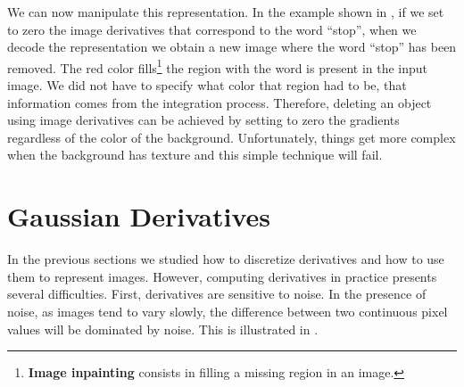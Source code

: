 We can now manipulate this representation. In the example shown in \fig{\ref{fig:edit_with_derivatives}}, if we set to zero the image derivatives that correspond to the word ``stop'', when we decode the representation we obtain a new image where the word ``stop'' has been removed. The red color fills\footnote{{\bf Image inpainting} consists in filling a missing region in an image.}  the region with the word is present in the input image.
We did not have to specify what color that region had to be, that information comes from the integration process. Therefore, deleting an object using image derivatives can be achieved by setting to zero the gradients regardless of the color of the background. Unfortunately, things get more complex when the background has texture and this simple technique will fail.




\section{Gaussian Derivatives}

In the previous sections we studied how to discretize derivatives and how to use them to represent images. However, computing derivatives in practice presents several difficulties. First, derivatives are sensitive to noise. In the presence of noise, as images tend to vary slowly, the difference between two continuous pixel values will be dominated by noise. This is illustrated in \fig{\ref{fig:derivativesnoisystop}}.


